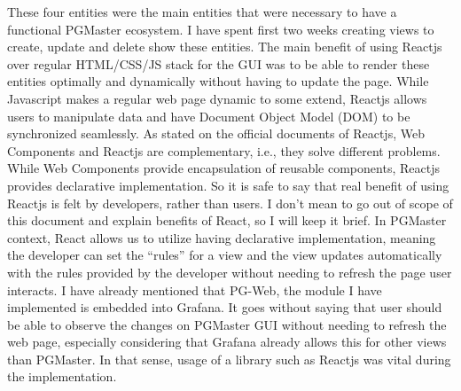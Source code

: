 These four entities were the main entities that were necessary to have a 
functional PGMaster ecosystem. I have spent first two weeks creating views 
to create, update and delete show these entities. The main benefit of using 
Reactjs over regular HTML/CSS/JS stack for the GUI was to be able to render 
these entities optimally and dynamically without having to update the page. 
While Javascript makes a regular web page dynamic to some extend, Reactjs 
allows users to manipulate data and have Document Object Model (DOM) to be 
synchronized seamlessly. As stated on the official documents of Reactjs, 
Web Components and Reactjs are complementary, i.e., they solve different 
problems. While Web Components provide encapsulation of reusable components, 
Reactjs provides declarative implementation. So it is safe to say that real 
benefit of using Reactjs is felt by developers, rather than users. I don't 
mean to go out of scope of this document and explain benefits of React, so I 
will keep it brief. In PGMaster context, React allows us to utilize having 
declarative implementation, meaning the developer can set the ``rules'' for 
a view and the view updates automatically with the rules provided by the 
developer without needing to refresh the page user interacts. I have already 
mentioned that PG-Web, the module I have implemented is embedded into Grafana. 
It goes without saying that user should be able to observe the changes on 
PGMaster GUI without needing to refresh the web page, especially considering 
that Grafana already allows this for other views than PGMaster. In that sense, 
usage of a library such as Reactjs was vital during the implementation.

